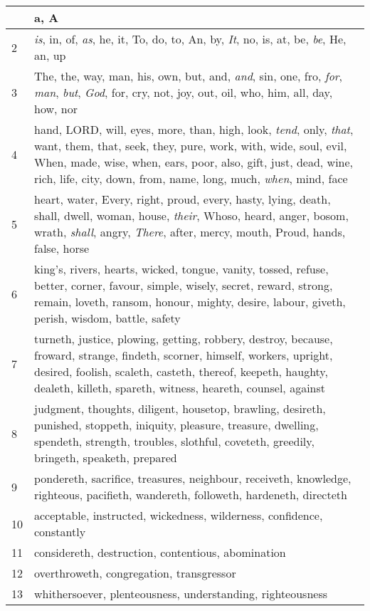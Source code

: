 \begin{center}
\begin{longtable}{l|p{3.75in}}
\hline \hline 
\endlastfoot 
1 & a, A\\ \hline 
2 & \emph{is}, in, of, \emph{as}, he, it, To, do, to, An, by, \emph{It}, no, is, at, be, \emph{be}, He, an, up\\ \hline 
3 & The, the, way, man, his, own, but, and, \emph{and}, sin, one, fro, \emph{for}, \emph{man}, \emph{but}, \emph{God}, for, cry, not, joy, out, oil, who, him, all, day, how, nor\\ \hline 
4 & hand, LORD, will, eyes, more, than, high, look, \emph{tend}, only, \emph{that}, want, them, that, seek, they, pure, work, with, wide, soul, evil, When, made, wise, when, ears, poor, also, gift, just, dead, wine, rich, life, city, down, from, name, long, much, \emph{when}, mind, face\\ \hline 
5 & heart, water, Every, right, proud, every, hasty, lying, death, shall, dwell, woman, house, \emph{their}, Whoso, heard, anger, bosom, wrath, \emph{shall}, angry, \emph{There}, after, mercy, mouth, Proud, hands, false, horse\\ \hline 
6 & king's, rivers, hearts, wicked, tongue, vanity, tossed, refuse, better, corner, favour, simple, wisely, secret, reward, strong, remain, loveth, ransom, honour, mighty, desire, labour, giveth, perish, wisdom, battle, safety\\ \hline 
7 & turneth, justice, plowing, getting, robbery, destroy, because, froward, strange, findeth, scorner, himself, workers, upright, desired, foolish, scaleth, casteth, thereof, keepeth, haughty, dealeth, killeth, spareth, witness, heareth, counsel, against\\ \hline 
8 & judgment, thoughts, diligent, housetop, brawling, desireth, punished, stoppeth, iniquity, pleasure, treasure, dwelling, spendeth, strength, troubles, slothful, coveteth, greedily, bringeth, speaketh, prepared\\ \hline 
9 & pondereth, sacrifice, treasures, neighbour, receiveth, knowledge, righteous, pacifieth, wandereth, followeth, hardeneth, directeth\\ \hline 
10 & acceptable, instructed, wickedness, wilderness, confidence, constantly\\ \hline 
11 & considereth, destruction, contentious, abomination\\ \hline 
12 & overthroweth, congregation, transgressor\\ \hline 
13 & whithersoever, plenteousness, understanding, righteousness\\ \hline 
\end{longtable} 
\end{center} 




 
